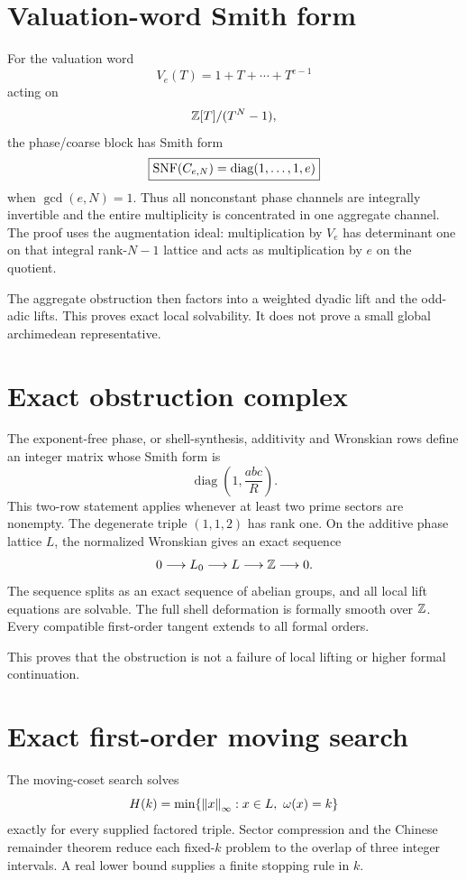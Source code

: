 \section{Valuation-word Smith form}
For the valuation word
\[
V_e(T)=1+T+\cdots+T^{e-1}
\]
acting on
\[
\mathbb Z[T]/(T^N-1),
\]
the phase/coarse block has Smith form
\[
\boxed{
\operatorname{SNF}(C_{e,N})
=
\operatorname{diag}(1,\ldots,1,e)
}
\]
when $\gcd(e,N)=1$. Thus all nonconstant phase channels are integrally invertible and the entire multiplicity is concentrated in one aggregate channel. The proof uses the augmentation ideal: multiplication by $V_e$ has determinant one on that integral rank-$N-1$ lattice and acts as multiplication by $e$ on the quotient.

The aggregate obstruction then factors into a weighted dyadic lift and the odd-adic lifts. This proves exact local solvability. It does not prove a small global archimedean representative.

\section{Exact obstruction complex}
The exponent-free phase, or shell-synthesis, additivity and Wronskian rows define an integer matrix whose Smith form is
\[
\boxed{
\operatorname{diag}\left(1,\frac{abc}{R}\right).
}
\]
This two-row statement applies whenever at least two prime sectors are nonempty. The degenerate triple $(1,1,2)$ has rank one. On the additive phase lattice $L$, the normalized Wronskian gives an exact sequence
\[
0\longrightarrow L_0
\longrightarrow L
\longrightarrow\mathbb Z
\longrightarrow0.
\]
The sequence splits as an exact sequence of abelian groups, and all local lift equations are solvable. The full shell deformation is formally smooth over $\mathbb Z$. Every compatible first-order tangent extends to all formal orders.

This proves that the obstruction is not a failure of local lifting or higher formal continuation.

\section{Exact first-order moving search}
The moving-coset search solves
\[
H(k)
=
\min\{\left\lVert x\right\rVert_\infty:x\in L,\ \omega(x)=k\}
\]
exactly for every supplied factored triple. Sector compression and the Chinese remainder theorem reduce each fixed-$k$ problem to the overlap of three integer intervals. A real lower bound supplies a finite stopping rule in $k$.

